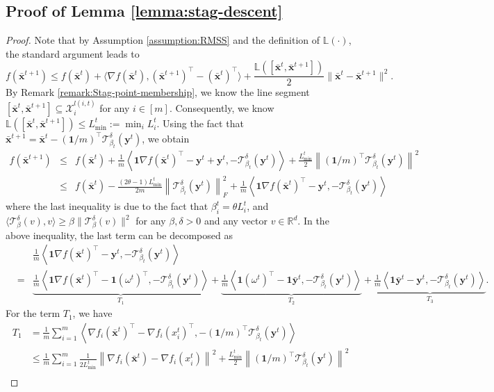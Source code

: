 \documentclass{article}
\newcommand{\cX}{\mathcal{X}}
\newcommand{\bL}{\mathbb{L}}
\newcommand{\ctdb}{\mathcal{T}^\delta_{\beta_t}}
\newcommand{\byt}{\mathbf{y}^t}
\newcommand{\bbxt}{\bar{\mathbf{x}}^t}
\newcommand{\bbxte}{\bar{\mathbf{x}}^{t+1}}
\newcommand{\bbyt}{\bar{\mathbf{y}}^t}
\newcommand{\RR}{\mathbb{R}}
\newcommand{\bone}{\mathbf{1}}
\begin{document}
\subsection{Proof of Lemma \ref{lemma:stag-descent}}
\label{appdx:lemma:stag-descent}
\begin{proof}     Note that by Assumption \ref{assumption:RMSS} and the definition of $\bL(\cdot)$, the standard argument leads to  
$$
f(\bbxte)\leq f(\bbxt) + \langle \nabla f(\bbxt), (\bbxte)^\top-(\bbxt)^\top\rangle + \frac{\bL([\bbxt,\bbxte])}{2}\|\bar{\mathbf{x}}^{t}-\bar{\mathbf{x}}^{t+1}\|^2.
$$
By Remark \ref{remark:Stag-point-membership}, we know the line segment $[\bbxt,\bbxte]\subseteq\cX_i^{l(i,t)}$ for any $i\in[m]$. Consequently, we know $\bL([\bbxt,\bbxte])\leq L_{\min}^t:=\min_i L_i^t$. Using the fact that $\bbxte = \bbxt - (\bone/m)^\top\ctdb(\byt)$, we obtain
\begin{eqnarray}
\label{lm:stag-descent-1}
f(\bbxte) &\leq& f(\bbxt) + \frac{1}{m}\left\langle \bone\nabla f(\bbxt)^\top - \byt + \byt, -\ctdb(\byt)\right\rangle + \frac{L_{\min}^t}{2}\left\|(\bone/m)^\top\ctdb(\byt)\right\|^2 \\
& \leq & f(\bbxt)  -  \frac{(2\theta-1)L_{\min}^t}{2m} \left\|\ctdb(\byt)\right\|_F^2 + \frac{1}{m}\left\langle \bone\nabla f(\bbxt)^\top - \byt , -\ctdb(\byt)\right\rangle  \nonumber
\end{eqnarray} 
where the last inequality is due to the fact that $\beta_i^t = \theta L_i^t$, and $\langle\mathcal{T}_\beta^\delta(v),v\rangle \geq \beta\|\mathcal{T}_\beta^\delta(v)\|^2$ for any $\beta,\delta>0$ and any vector $v\in\RR^d$.  In the above inequality, the last term can be decomposed as 
\begin{eqnarray} \label{lm:stag-descent-2}
&&\frac{1}{m}\left\langle\bone\nabla f(\bbxt)^\top - \byt , -\ctdb(\byt)\right\rangle \\
&=& \underbrace{\frac{1}{m}\left\langle \bone\nabla f(\bbxt)^\top - \bone(\omega^t)^\top , -\ctdb(\byt)\right\rangle}_{T_1} 
+ \underbrace{\frac{1}{m}\left\langle\bone(\omega^t)^\top - \bone\bbyt , -\ctdb(\byt)\right\rangle}_{T_2} + \underbrace{\frac{1}{m}\left\langle \bone\bbyt - \byt , -\ctdb(\byt)\right\rangle}_{T_3}. \nonumber
\end{eqnarray}  
For the term $T_1$, we have 
\begin{align*}
   T_1
   & = \frac{1}{m}\sum_{i=1}^m\left \langle \nabla f_i(\bar{\mathbf{x}}^{t})^\top- \nabla f_i(x_i^t)^\top, - (\bone/m)^\top\ctdb(\byt)\right\rangle \\
   & \leq\frac{1}{m}\sum_{i=1}^m\frac{1}{2L_{\min}^t}\left\|\nabla f_i(\bar{\mathbf{x}}^{t})- \nabla f_i(x_i^t)\right\|^2+ \frac{L_{\min}^t}{2} \left\|(\bone/m)^\top\ctdb(\byt)\right\|^2 \\

\end{align*}
\end{proof}
\end{document}
